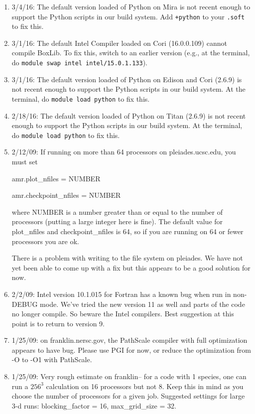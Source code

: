 \begin{enumerate}

\item 3/4/16: The default version loaded of Python on Mira is not recent enough to support the Python scripts in our build system. Add {\tt +python} to your {\tt .soft} to fix this.

\item 3/1/16: The default Intel Compiler loaded on Cori (16.0.0.109)
  cannot compile BoxLib. To fix this, switch to an earlier version
  (e.g., at the terminal, do {\tt module swap intel intel/15.0.1.133}).

\item 3/1/16: The default version loaded of Python on Edison and Cori (2.6.9) is not recent enough to support the Python scripts in our build system. At the terminal, do {\tt module load python} to fix this.

\item 2/18/16: The default version loaded of Python on Titan (2.6.9) is not recent enough to support the Python scripts in our build system. At the terminal, do {\tt module load python} to fix this.

\item 2/12/09: If running on more than 64 processors on pleiades.ucsc.edu, you must set

amr.plot\_nfiles = NUMBER

amr.checkpoint\_nfiles = NUMBER

where NUMBER is a number greater than or equal to the number of processors (putting a large integer here is fine). The default value for plot\_nfiles and checkpoint\_nfiles is 64, so if you are running on 64 or fewer processors you are ok.

There is a problem with writing to the file system on pleiades. We have not yet been able to come up with a fix but this appears to be a good solution for now.

\item 2/2/09: Intel version 10.1.015 for Fortran has a known bug when run in non-DEBUG mode. We've tried the new version 11 as well and parts of the code no longer compile. So beware the Intel compilers. Best suggestion at this point is to return to version 9.

\item 1/25/09: on franklin.nersc.gov, the PathScale compiler with full optimization appears to have bug. Please use PGI for now, or reduce the optimization from -O to -O1 with PathScale.

\item 1/25/09: Very rough estimate on franklin-- for a code with 1 species, one can run a $256^3$ calculation on 16 processors but not 8. Keep this in mind as you choose the number of processors for a given job. Suggested settings for large 3-d runs: blocking\_factor = 16, max\_grid\_size = 32. 
\end{enumerate}

